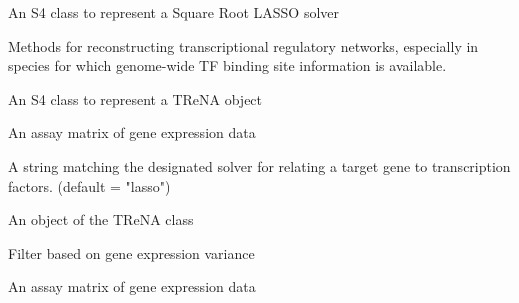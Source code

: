 \documentclass[a4paper]{book}
\begin{document}
%
\begin{Description}\relax
An S4 class to represent a Square Root LASSO solver
\end{Description}
%
\begin{Description}\relax
Methods for reconstructing transcriptional regulatory networks, especially in species
for which genome-wide TF binding site information is available.

\end{Description}
%
\begin{Description}\relax
An S4 class to represent a TReNA object
\end{Description}
%
\begin{Arguments}
\begin{ldescription}
\item[\code{mtx.assay}] An assay matrix of gene expression data

\item[\code{solver}] A string matching the designated solver for relating a target gene to transcription factors. (default = "lasso")
\end{ldescription}
\end{Arguments}
%
\begin{Value}
An object of the TReNA class
\end{Value}
%
\begin{Description}\relax
Filter based on gene expression variance
\end{Description}
%
\begin{Arguments}
\begin{ldescription}
\item[\code{mtx.assay}] An assay matrix of gene expression data
\end{ldescription}
\end{Arguments}
\printindex{}
\end{document}
